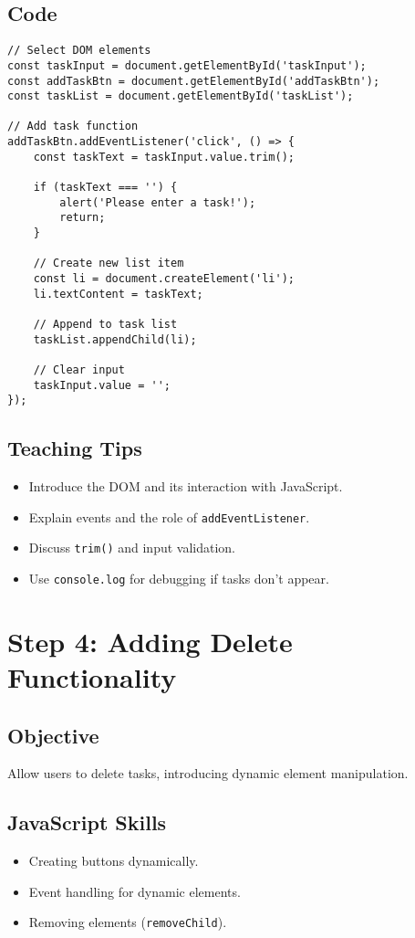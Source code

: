 \documentclass[a4paper,12pt]{article}
\begin{document}
\subsection{Code}
\lstset{language=JavaScript}
\begin{lstlisting}
// Select DOM elements
const taskInput = document.getElementById('taskInput');
const addTaskBtn = document.getElementById('addTaskBtn');
const taskList = document.getElementById('taskList');

// Add task function
addTaskBtn.addEventListener('click', () => {
    const taskText = taskInput.value.trim();
    
    if (taskText === '') {
        alert('Please enter a task!');
        return;
    }
    
    // Create new list item
    const li = document.createElement('li');
    li.textContent = taskText;
    
    // Append to task list
    taskList.appendChild(li);
    
    // Clear input
    taskInput.value = '';
});
\end{lstlisting}

\subsection{Teaching Tips}
\begin{itemize}
    \item Introduce the DOM and its interaction with JavaScript.
    \item Explain events and the role of \texttt{addEventListener}.
    \item Discuss \texttt{trim()} and input validation.
    \item Use \texttt{console.log} for debugging if tasks don't appear.
\end{itemize}

\section{Step 4: Adding Delete Functionality}
\subsection{Objective}
Allow users to delete tasks, introducing dynamic element manipulation.

\subsection{JavaScript Skills}
\begin{itemize}
    \item Creating buttons dynamically.
    \item Event handling for dynamic elements.
    \item Removing elements (\texttt{removeChild}).
\end{itemize}
\end{document}
